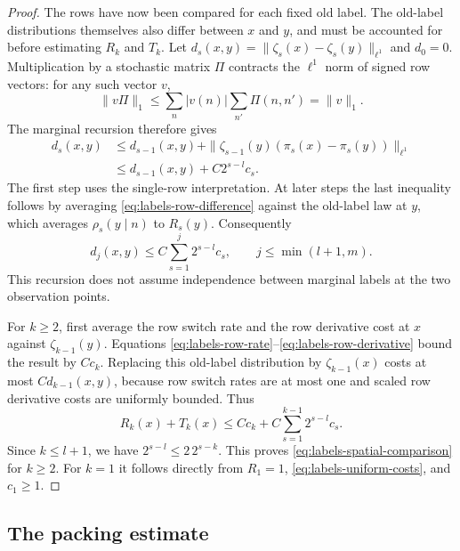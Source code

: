 \begin{proof}
The rows have now been compared for each fixed old label. The old-label
distributions themselves also differ between $x$ and $y$, and must be
accounted for before estimating $R_k$ and $T_k$.
Let $d_s(x,y)=\|\zeta_s(x)-\zeta_s(y)\|_{\ell^1}$ and $d_0=0$.
Multiplication by a stochastic matrix $\Pi$ contracts the $\ell^1$
norm of signed row vectors: for any such vector $v$,
\[
 \|v\Pi\|_1
 \le\sum_n |v(n)|\sum_{n'}\Pi(n,n')=\|v\|_1.
\]
The marginal recursion therefore gives
\begin{align*}
 d_s(x,y)
 &\le d_{s-1}(x,y)
   +\|\zeta_{s-1}(y)(\pi_s(x)-\pi_s(y))\|_{\ell^1}\\
 &\le d_{s-1}(x,y)+C2^{s-l}c_s.
\end{align*}
The first step uses the single-row interpretation. At later steps the
last inequality follows by averaging \eqref{eq:labels-row-difference}
against the old-label law at $y$, which averages
$\rho_s(y\mid n)$ to $R_s(y)$. Consequently
\begin{equation}
 d_j(x,y)\le C\sum_{s=1}^j2^{s-l}c_s,
 \qquad j\le\min(l+1,m).
 \label{eq:labels-marginal-distance}
\end{equation}
This recursion does not assume independence between marginal labels
at the two observation points.

For $k\ge2$, first average the row switch rate and the row derivative
cost at $x$ against $\zeta_{k-1}(y)$. Equations
\eqref{eq:labels-row-rate}--\eqref{eq:labels-row-derivative} bound the
result by $C c_k$. Replacing this old-label distribution by
$\zeta_{k-1}(x)$ costs at most $C d_{k-1}(x,y)$, because row switch rates
are at most one and scaled row derivative costs are uniformly bounded.
Thus
\[
 R_k(x)+T_k(x)
 \le C c_k+C\sum_{s=1}^{k-1}2^{s-l}c_s.
\]
Since $k\le l+1$, we have $2^{s-l}\le2\,2^{s-k}$. This proves
\eqref{eq:labels-spatial-comparison} for $k\ge2$. For $k=1$ it follows
directly from $R_1=1$, \eqref{eq:labels-uniform-costs}, and $c_1\ge1$.
\end{proof}

\subsection{The packing estimate}

